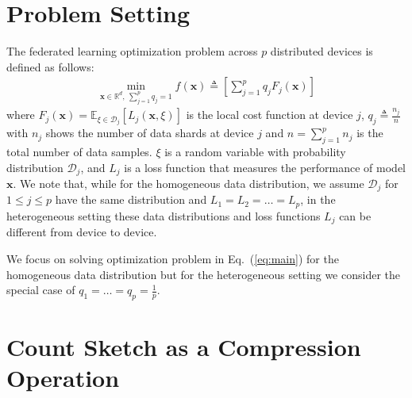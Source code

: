 
\section{Problem Setting}
\label{sec:problem}


The federated learning optimization problem across $p$ distributed devices is defined as follows:
\begin{align}\label{eq:main}
   \min_{\boldsymbol{x}\in \mathbb{R}^{d},\: \sum_{j=1}^pq_j=1} f(\boldsymbol{x})\triangleq \left[\sum_{j=1}^{p}q_jF_j(\boldsymbol{x})\right]
\end{align}
where $F_j(\boldsymbol{x})=\mathbb{E}_{\xi\in\mathcal{D}_j}\left[L_j\left(\boldsymbol{x},\xi\right)\right]$ is the local cost function at device $j$, $q_j\triangleq\frac{n_j}{n}$ with $n_j$ shows the number of data shards at device $j$ and $n=\sum_{j=1}^pn_j$ is the total number of data samples.
$\xi$ is a random variable with probability distribution $\mathcal{D}_j$, and $L_j$ is a loss function that measures the performance of model $\boldsymbol{x}$. 
We note that, while for the homogeneous data distribution, we assume $\mathcal{D}_j$ for $1\leq j\leq p$ have the same distribution and $L_1=L_2=\ldots=L_p$, in the heterogeneous setting these data distributions and loss functions $L_j$ can be different from device to device. 

We focus on solving optimization problem in Eq.~(\ref{eq:main}) for the homogeneous data distribution but for the heterogeneous setting we consider the special case of $q_1=\ldots=q_p=\frac{1}{p}$. 

\section{Count Sketch as a Compression Operation}\label{sec:compression}

